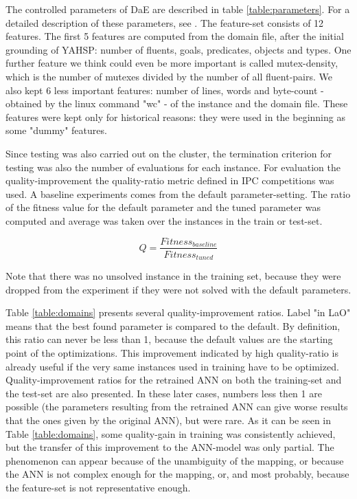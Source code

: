 \documentclass{MYsig-alternate}
\begin{document}
The controlled parameters of DaE are described in table \ref{table:parameters}. For a detailed description of these parameters, see \cite{BibGECCO:2010}. The feature-set consists of 12 features. The first 5 features are computed from the domain file, after the initial grounding of YAHSP: number of fluents, goals, predicates, objects and types. One further feature we think could even be more important is called mutex-density, which is the number of mutexes divided by the number of all fluent-pairs. We also kept 6 less important features: number of lines, words and byte-count - obtained by the linux command "wc" - of the instance and the domain file. These features were kept only for historical reasons: they were used in the beginning as some "dummy" features.

Since testing was also carried out on the cluster, the termination criterion for testing was also the number of evaluations for each instance. For evaluation the quality-improvement the quality-ratio metric defined in IPC competitions was used. A baseline experiments comes from the default parameter-setting. The ratio of the fitness value for the default parameter and the tuned parameter was computed and average was taken over the instances in the train or test-set. 

\begin{equation}Q=\frac{Fitness_{baseline}}{Fitness_{tuned}}\end{equation}

Note that there was no unsolved instance in the training set, because they were dropped from the experiment if they were not solved with the default parameters. 

Table \ref{table:domains} presents several quality-improvement ratios. Label "in LaO" means that the best found parameter is compared to the default. By definition, this ratio can never be less than 1, because the default values are the starting point of the optimizations. This improvement indicated by high quality-ratio is already useful if the very same instances used in training have to be optimized. Quality-improvement ratios for the retrained ANN on both the training-set and the test-set are also presented. In these later cases, numbers less then 1 are possible (the parameters resulting from the retrained ANN can give worse results that the ones given by the original ANN), but were rare. As it can be seen in Table \ref{table:domains}, some quality-gain in training was consistently achieved, but the transfer of this improvement to the ANN-model was only partial. The phenomenon can appear because of the unambiguity of the mapping, or because the ANN is not complex enough for the mapping, or, and most probably, because the feature-set is not representative enough. 
\end{document}
